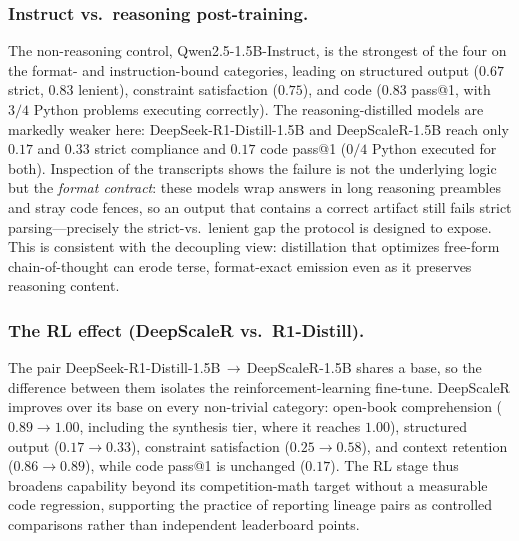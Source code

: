\documentclass[runningheads]{llncs}
\begin{document}
\subsubsection{Instruct vs.\ reasoning post-training.}
The non-reasoning control, Qwen2.5-1.5B-Instruct, is the strongest of the four on
the format- and instruction-bound categories, leading on structured output
($0.67$ strict, $0.83$ lenient), constraint satisfaction ($0.75$), and code
($0.83$ pass@1, with $3/4$ Python problems executing correctly). The
reasoning-distilled models are markedly weaker here: DeepSeek-R1-Distill-1.5B and
DeepScaleR-1.5B reach only $0.17$ and $0.33$ strict compliance and $0.17$ code
pass@1 ($0/4$ Python executed for both). Inspection of the transcripts shows the
failure is not the underlying logic but the \emph{format contract}: these models
wrap answers in long reasoning preambles and stray code fences, so an output that
contains a correct artifact still fails strict parsing---precisely the strict-vs.\
lenient gap the protocol is designed to expose. This is consistent with the
decoupling view: distillation that optimizes free-form chain-of-thought can erode
terse, format-exact emission even as it preserves reasoning content.

\subsubsection{The RL effect (DeepScaleR vs.\ R1-Distill).}
The pair DeepSeek-R1-Distill-1.5B\,$\rightarrow$\,DeepScaleR-1.5B shares a base,
so the difference between them isolates the reinforcement-learning fine-tune.
DeepScaleR improves over its base on every non-trivial category: open-book
comprehension ($0.89\!\rightarrow\!1.00$, including the synthesis tier, where it
reaches $1.00$), structured output ($0.17\!\rightarrow\!0.33$), constraint
satisfaction ($0.25\!\rightarrow\!0.58$), and context retention
($0.86\!\rightarrow\!0.89$), while code pass@1 is unchanged ($0.17$). The RL stage
thus broadens capability beyond its competition-math target without a measurable
code regression, supporting the practice of reporting lineage pairs as controlled
comparisons rather than independent leaderboard points.
\end{document}
